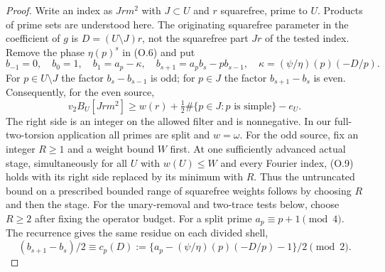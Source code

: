 \documentclass[11pt]{article}
\theoremstyle{definition}
\theoremstyle{remark}
\begin{document}
\begin{proof}
Write an index as $Jrm^2$ with $J\subset U$ and $r$ squarefree,
prime to $U$. Products of prime sets are understood here.
The originating squarefree parameter in the coefficient of $g$ is
$D=(U\setminus J)r$, not the squarefree part $Jr$ of the tested index.
Remove the phase $\eta(p)^s$ in (O.6) and put
\[
 b_{-1}=0,\quad b_0=1,\quad b_1=a_p-\kappa,\quad
 b_{s+1}=a_pb_s-pb_{s-1},\quad
 \kappa=(\psi/\eta)(p)(-D/p).
\]
For $p\in U\setminus J$ the factor $b_s-b_{s-1}$ is odd;
for $p\in J$ the factor $b_{s+1}-b_s$ is even.
Consequently, for the even source,
\[
 v_2B_U[Jrm^2]\ge w(r)
              +\tfrac12\#\{p\in J:p\text{ is simple}\}-e_U.      \tag{O.9}
\]
The right side is an integer on the allowed filter and is
nonnegative. In our full-two-torsion application all primes are
split and $w=\omega$.
For the odd source, fix an integer $R\ge1$ and a weight bound $W$
first. At one sufficiently advanced actual stage, simultaneously for
all $U$ with $w(U)\le W$ and every Fourier index, (O.9) holds with
its right side replaced by its minimum with $R$. Thus the untruncated
bound on a prescribed bounded range of squarefree weights follows by
choosing $R$ and then the stage. For the unary-removal and two-trace
tests below, choose $R\ge2$ after fixing the operator budget.
For a split prime $a_p\equiv p+1\pmod4$. The recurrence gives the
same residue on each divided shell,
\[
        (b_{s+1}-b_s)/2\equiv
     c_p(D):=\{a_p-(\psi/\eta)(p)(-D/p)-1\}/2\pmod2.              \tag{O.10}
\]


\end{proof}
\end{document}

